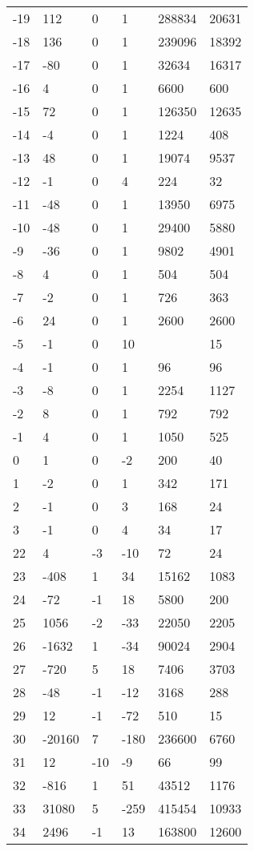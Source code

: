 \documentclass{amsart}
\begin{document}
\begin{longtable}{llllll}
-19 & 112 & 0 & 1 & 288834 & 20631\\
-18 & 136 & 0 & 1 & 239096 & 18392\\
-17 & -80 & 0 & 1 & 32634 & 16317\\
-16 & 4 & 0 & 1 & 6600 & 600\\
-15 & 72 & 0 & 1 & 126350 & 12635\\
-14 & -4 & 0 & 1 & 1224 & 408\\
-13 & 48 & 0 & 1 & 19074 & 9537\\
-12 & -1 & 0 & 4 & 224 & 32\\
-11 & -48 & 0 & 1 & 13950 & 6975\\
-10 & -48 & 0 & 1 & 29400 & 5880\\
-9 & -36 & 0 & 1 & 9802 & 4901\\
-8 & 4 & 0 & 1 & 504 & 504\\
-7 & -2 & 0 & 1 & 726 & 363\\
-6 & 24 & 0 & 1 & 2600 & 2600\\
-5 & -1 & 0 & 10 &  & 15\\
-4 & -1 & 0 & 1 & 96 & 96\\
-3 & -8 & 0 & 1 & 2254 & 1127\\
-2 & 8 & 0 & 1 & 792 & 792\\
-1 & 4 & 0 & 1 & 1050 & 525\\
0 & 1 & 0 & -2 & 200 & 40\\
1 & -2 & 0 & 1 & 342 & 171\\
2 & -1 & 0 & 3 & 168 & 24\\
3 & -1 & 0 & 4 & 34 & 17\\
22 & 4 & -3 & -10 & 72 & 24\\
23 & -408 & 1 & 34 & 15162 & 1083\\
24 & -72 & -1 & 18 & 5800 & 200\\
25 & 1056 & -2 & -33 & 22050 & 2205\\
26 & -1632 & 1 & -34 & 90024 & 2904\\
27 & -720 & 5 & 18 & 7406 & 3703\\
28 & -48 & -1 & -12 & 3168 & 288\\
29 & 12 & -1 & -72 & 510 & 15\\
30 & -20160 & 7 & -180 & 236600 & 6760\\
31 & 12 & -10 & -9 & 66 & 99\\
32 & -816 & 1 & 51 & 43512 & 1176\\
33 & 31080 & 5 & -259 & 415454 & 10933\\
34 & 2496 & -1 & 13 & 163800 & 12600\\

\end{longtable}
\end{document}
